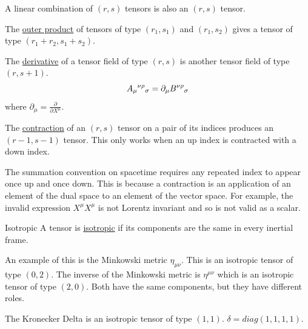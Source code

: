 \documentclass[../Main.tex]{subfiles}
\begin{document}
\begin{propositions}{
        
        \label{propsTensorProps}
    }
    \item A linear combination of $(r, s)$ tensors is also an $(r, s)$ tensor. \label{propTensorLinearCombo}
    \item The \underline{outer product} of tensors of type $(r_1, s_1)$ and $(r_1, s_2)$ gives a tensor of type $(r_1 + r_2, s_1 + s_2)$. \label{propTensorOuterProd}
    \item The \underline{derivative} of a tensor field of type $(r, s)$ is another tensor field of type $(r, s+1)$.
        \begin{equation*}
            A_\mu\indx{}{\nu \rho}{\sigma} = \partial_\mu \indx{B}{\nu \rho}{\sigma}
        \end{equation*}
        where $\partial_\mu = \frac{\partial}{\partial X^\mu}$. \label{propTensorDerivative}
    \item The \underline{contraction} of an $(r, s)$ tensor on a pair of its indices produces an $(r-1, s-1)$ tensor. This only works when an up index is contracted with a down index. \label{propTensorContract}
\end{propositions}
The summation convention on spacetime requires any repeated index to appear once up and once down. This is because a contraction is an application of an element of the dual space to an element of the vector space. For example, the invalid expression $X^\mu X^\mu$ is not Lorentz invariant and so is not valid as a scalar.

\begin{definition}{Isotropic}
    A tensor is \underline{isotropic} if its components are the same in every inertial frame.
\end{definition}
\begin{remark}
    An example of this is the Minkowski metric $\eta_{\mu \nu}$. This is an isotropic tensor of type $(0, 2)$. The inverse of the Minkowski metric is $\eta^{\mu\nu}$ which is an isotropic tensor of type $(2, 0)$. Both have the same components, but they have different roles.
\end{remark}
The Kronecker Delta is an isotropic tensor of type $(1, 1)$. $\delta = diag(1,1, 1, 1)$.
\end{document}
